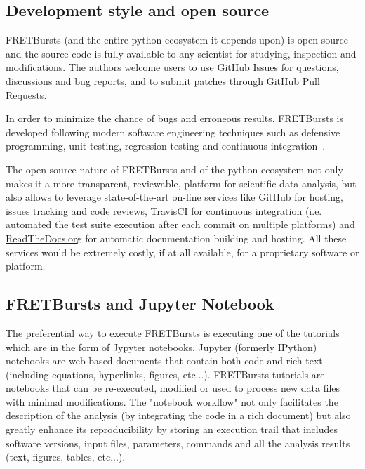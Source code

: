 \subsection{Development style and open source}

FRETBursts (and the entire python ecosystem it depends upon) is open source 
and the source code is fully available to any scientist for studying, 
inspection and modifications.
The authors welcome users to use GitHub Issues for questions, discussions
and bug reports, and to submit patches through GitHub Pull Requests.

In order to minimize the chance of bugs and erroneous results, FRETBursts is developed
following modern software engineering techniques such 
as defensive programming, unit testing, regression testing and continuous integration~\cite{Wilson_2014}.

The open source nature of FRETBursts and of the python ecosystem 
not only makes it a more transparent, reviewable, platform 
for scientific data analysis, but also allows 
to leverage state-of-the-art on-line services like \href{http://https://github.com}{GitHub} for hosting, 
issues tracking and code reviews, 
\href{https://travis-ci.org}{TravisCI} for continuous integration (i.e. automated the test suite execution after 
each commit on multiple platforms) 
and \href{https://readthedocs.org/}{ReadTheDocs.org} for automatic documentation building and hosting. 
All these services would be extremely costly, if at all available, 
for a proprietary software or platform.

\subsection{FRETBursts and Jupyter Notebook}

The preferential way to execute FRETBursts is executing one of the tutorials 
which are in the form of \href{http://ipython.org/notebook.html}{Jypyter notebooks}.
Jupyter (formerly IPython) notebooks are web-based documents that contain both 
code and rich text (including equations, hyperlinks, figures, etc...).
FRETBursts tutorials are notebooks that can be re-executed,
modified or used to process new data files with minimal modifications.
The "notebook workflow"\cite{Shen_2014} not only facilitates 
the description of the analysis (by integrating the code in a rich document)
but also greatly enhance its reproducibility by storing an execution trail
that includes software versions, input files, parameters, commands and all
the analysis results (text, figures, tables, etc...).

